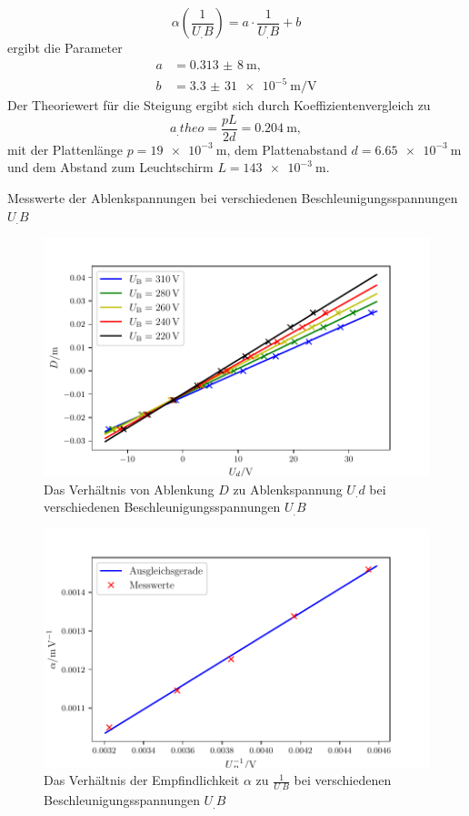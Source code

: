 \[\alpha\left(\frac{1}{U_.B}\right)=a\cdot\frac{1}{U_.B}+b\]
ergibt die Parameter
\begin{align*}
a&=\SI{0,313(8)}{\metre},\\
b&=\SI{3,3(31)e-5}{\metre\per\volt}
\end{align*}
Der Theoriewert für die Steigung ergibt sich durch Koeffizientenvergleich zu
\[
a_.{theo}=\frac{pL}{2d}=\SI{0,204}{\metre},
\]
mit der Plattenlänge $p=\SI{19e-3}{\metre}$, dem Plattenabstand $d=\SI{6,65e-3}{\metre}$ und dem Abstand zum Leuchtschirm $L=\SI{143e-3}{\metre}$\cite{V501}.
\begin{table}
\centering
\caption{Messwerte der Ablenkspannungen bei verschiedenen Beschleunigungsspannungen $U_.B$}

\label{tab:Elek}
\end{table}
\begin{figure}
\centering
\includegraphics[width=\linewidth-70pt,height=\textheight-70pt,keepaspectratio]{content/images/GraphElek.pdf}
\caption{Das Verhältnis von Ablenkung $D$ zu Ablenkspannung $U_.d$ bei verschiedenen Beschleunigungsspannungen $U_.B$}\label{fig:Elek}
\end{figure}
\begin{figure}
\centering
\includegraphics[width=\linewidth-70pt,height=\textheight-70pt,keepaspectratio]{content/images/GraphElek6.pdf}
\caption{Das Verhältnis der Empfindlichkeit $\alpha$ zu $\frac{1}{U_.B}$ bei verschiedenen Beschleunigungsspannungen $U_.B$}\label{fig:Elek2}
\end{figure}

